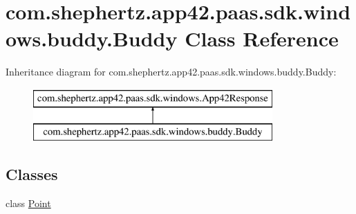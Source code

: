 \hypertarget{classcom_1_1shephertz_1_1app42_1_1paas_1_1sdk_1_1windows_1_1buddy_1_1_buddy}{\section{com.\+shephertz.\+app42.\+paas.\+sdk.\+windows.\+buddy.\+Buddy Class Reference}
\label{classcom_1_1shephertz_1_1app42_1_1paas_1_1sdk_1_1windows_1_1buddy_1_1_buddy}
}
Inheritance diagram for com.\+shephertz.\+app42.\+paas.\+sdk.\+windows.\+buddy.\+Buddy\+:\begin{figure}[H]
\begin{center}
\leavevmode
\includegraphics[height=2.000000cm]{classcom_1_1shephertz_1_1app42_1_1paas_1_1sdk_1_1windows_1_1buddy_1_1_buddy}
\end{center}
\end{figure}
\subsection*{Classes}
\begin{DoxyCompactItemize}
\item 
class \hyperlink{classcom_1_1shephertz_1_1app42_1_1paas_1_1sdk_1_1windows_1_1buddy_1_1_buddy_1_1_point}{Point}
\end{DoxyCompactItemize}
